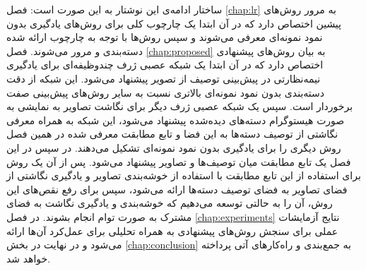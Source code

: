  ساختار ادامه‌ی این نوشتار به این صورت است:  فصل \ref{chap:lr} به مرور روش‌های پیشین اختصاص دارد که در آن ابتدا یک چارچوب کلی برای روش‌های یادگیری بدون نمود نمونه‌ای معرفی می‌شوند و سپس روش‌ها با توجه به چارچوب ارائه شده دسته‌بندی و مرور می‌شوند. فصل \ref{chap:proposed} به بیان روش‌های پیشنهادی اختصاص دارد که در آن ابتدا یک شبکه عصبی ژرف چندوظیفه‌ای برای یادگیری نیمه‌نظارتی در پیش‌بینی توصیف از تصویر پیشنهاد می‌شود. این شبکه از دقت دسته‌بندی بدون نمود نمونه‌ای بالاتری نسبت به سایر روش‌های پیش‌بینی صفت برخوردار است. سپس یک شبکه عصبی ژرف دیگر برای نگاشت تصاویر به نمایشی به صورت هیستوگرام دسته‌های دیده‌شده پیشنهاد می‌شود، این شبکه به همراه معرفی نگاشتی از توصیف دسته‌ها به این فضا و تابع مطابقت معرفی شده در همین فصل روش دیگری را برای یادگیری بدون نمود نمونه‌ای تشکیل می‌دهند.  در سپس در این فصل یک تابع مطابقت میان توصیف‌ها و تصاویر پیشنهاد می‌شود. پس از آن یک روش برای استفاده از این تابع مطابقت با استفاده از خوشه‌بندی تصاویر و یادگیری نگاشتی از فضای تصاویر به فضای توصیف دسته‌ها ارائه می‌شود، سپس برای رفع نقص‌های این روش، آن را به حالتی توسعه می‌دهیم که خوشه‌بندی و یادگیری نگاشت به فضای مشترک به صورت توام انجام بشوند. در فصل
 \ref{chap:experiments}
نتایج آزمایشات عملی برای سنجش روش‌های پیشنهادی به همراه تحلیلی برای عمل‌کرد آن‌ها ارائه می‌شود و در نهایت در بخش \ref{chap:conclusion} به جمع‌بندی و راه‌کارهای آتی پرداخته خواهد شد.
